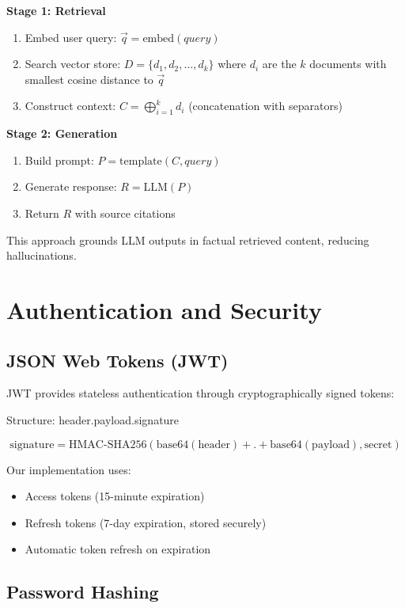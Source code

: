 \documentclass[12pt]{report}
\begin{document}
\textbf{Stage 1: Retrieval}
\begin{enumerate}
    \item Embed user query: $\vec{q} = \text{embed}(query)$
    \item Search vector store: $D = \{d_1, d_2, \ldots, d_k\}$ where $d_i$ are the $k$ documents with smallest cosine distance to $\vec{q}$
    \item Construct context: $C = \bigoplus_{i=1}^{k} d_i$ (concatenation with separators)
\end{enumerate}

\textbf{Stage 2: Generation}
\begin{enumerate}
    \item Build prompt: $P = \text{template}(C, query)$
    \item Generate response: $R = \text{LLM}(P)$
    \item Return $R$ with source citations
\end{enumerate}

This approach grounds LLM outputs in factual retrieved content, reducing hallucinations.

\section{Authentication and Security}

\subsection{JSON Web Tokens (JWT)}

JWT provides stateless authentication through cryptographically signed tokens:

Structure: header.payload.signature

$$
\text{signature} = \text{HMAC-SHA256}(\text{base64}(\text{header}) + \text{.} + \text{base64}(\text{payload}), \text{secret})
$$

Our implementation uses:
\begin{itemize}
    \item Access tokens (15-minute expiration)
    \item Refresh tokens (7-day expiration, stored securely)
    \item Automatic token refresh on expiration
\end{itemize}

\subsection{Password Hashing}
\end{document}
